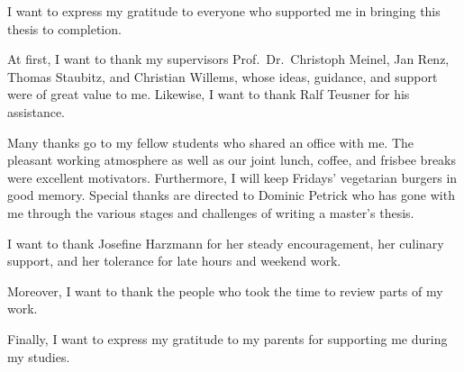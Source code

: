 I want to express my gratitude to everyone who supported me in bringing this thesis to completion.

At first, I want to thank my supervisors Prof.\ Dr.\ Christoph Meinel, Jan Renz, Thomas Staubitz, and Christian Willems, whose ideas, guidance, and support were of great value to me. Likewise, I want to thank Ralf Teusner for his assistance.

Many thanks go to my fellow students who shared an office with me. The pleasant working atmosphere as well as our joint lunch, coffee, and frisbee breaks were excellent motivators. Furthermore, I will keep Fridays' vegetarian burgers in good memory. Special thanks are directed to Dominic Petrick who has gone with me through the various stages and challenges of writing a master's thesis.

I want to thank Josefine Harzmann for her steady encouragement, her culinary support, and her tolerance for late hours and weekend work.

Moreover, I want to thank the people who took the time to review parts of my work.

Finally, I want to express my gratitude to my parents for supporting me during my studies.
